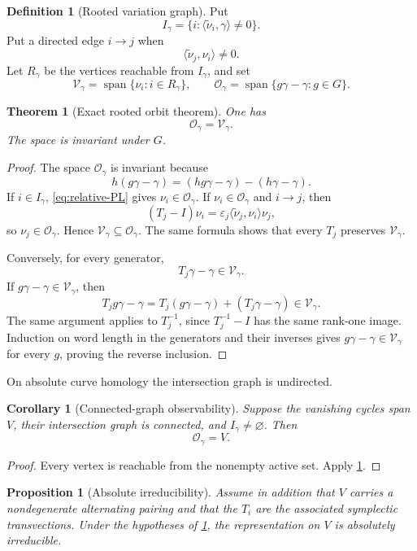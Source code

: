 \documentclass[11pt]{article}
\numberwithin{equation}{section}
\newtheorem{theorem}{Theorem}[section]
\newtheorem{proposition}[proposition]{Proposition}
\newtheorem{corollary}[corollary]{Corollary}
\theoremstyle{definition}
\newtheorem{definition}[definition]{Definition}
\theoremstyle{remark}
\newcommand{\Span}{\operatorname{span}}
\newcommand{\Ocal}{\mathcal O}
\newcommand{\Vcal}{\mathcal V}
\begin{document}
\begin{definition}[Rooted variation graph]\label{def:rooted-graph}
Put
\[
  I_\gamma
  =\{i:\langle\widetilde\nu_i,\gamma\rangle\ne0\}.
\]
Put a directed edge $i\to j$ when
\[
  \langle\widetilde\nu_j,\nu_i\rangle\ne0.
\]
Let $R_\gamma$ be the vertices reachable from $I_\gamma$, and set
\[
  \Vcal_\gamma=\Span\{\nu_i:i\in R_\gamma\},
  \qquad
  \Ocal_\gamma=\Span\{g\gamma-\gamma:g\in G\}.
\]
\end{definition}

\begin{theorem}[Exact rooted orbit theorem]\label{thm:rooted-orbit}
One has
\[
  \Ocal_\gamma=\Vcal_\gamma.
\]
The space is invariant under $G$.
\end{theorem}

\begin{proof}
The space $\Ocal_\gamma$ is invariant because
\[
  h(g\gamma-\gamma)
  =(hg\gamma-\gamma)-(h\gamma-\gamma).
\]
If $i\in I_\gamma$, \eqref{eq:relative-PL} gives $\nu_i\in\Ocal_\gamma$.
If $\nu_i\in\Ocal_\gamma$ and $i\to j$, then
\[
  (T_j-I)\nu_i
  =\varepsilon_j\langle\widetilde\nu_j,\nu_i\rangle\nu_j,
\]
so $\nu_j\in\Ocal_\gamma$.  Hence
$\Vcal_\gamma\subseteq\Ocal_\gamma$.  The same formula shows that every
$T_j$ preserves $\Vcal_\gamma$.

Conversely, for every generator,
\[
  T_j\gamma-\gamma\in\Vcal_\gamma.
\]
If $g\gamma-\gamma\in\Vcal_\gamma$, then
\[
  T_j g\gamma-\gamma
  =T_j(g\gamma-\gamma)+(T_j\gamma-\gamma)
  \in\Vcal_\gamma.
\]
The same argument applies to $T_j^{-1}$, since
$T_j^{-1}-I$ has the same rank-one image.  Induction on word length in the
generators and their inverses gives
$g\gamma-\gamma\in\Vcal_\gamma$ for every $g$, proving the reverse
inclusion.
\end{proof}

On absolute curve homology the intersection graph is undirected.

\begin{corollary}[Connected-graph observability]\label{cor:connected-observable}
Suppose the vanishing cycles span $V$, their intersection graph is connected,
and $I_\gamma\ne\varnothing$.  Then
\[
  \Ocal_\gamma=V.
\]
\end{corollary}

\begin{proof}
Every vertex is reachable from the nonempty active set.  Apply
\cref{thm:rooted-orbit}.
\end{proof}

\begin{proposition}[Absolute irreducibility]\label{prop:absolute-irred}
Assume in addition that $V$ carries a nondegenerate alternating pairing and
that the $T_i$ are the associated symplectic transvections.  Under the
hypotheses of \cref{cor:connected-observable}, the representation on $V$ is
absolutely irreducible.
\end{proposition}
\end{document}
